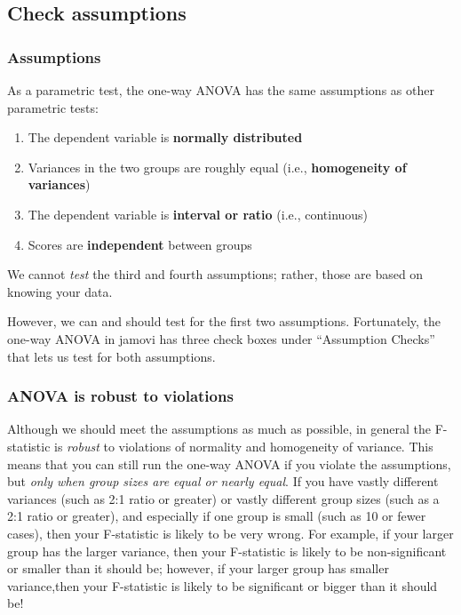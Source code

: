 \documentclass[
]{book}
\begin{document}
\hypertarget{anova-assumptions}{%
\subsection{Check assumptions}\label{anova-assumptions}}

\hypertarget{assumptions-3}{%
\subsubsection{Assumptions}\label{assumptions-3}}

As a parametric test, the one-way ANOVA has the same assumptions as other parametric tests:

\begin{enumerate}
\def\labelenumi{\arabic{enumi}.}
\item
  The dependent variable is \textbf{normally distributed}
\item
  Variances in the two groups are roughly equal (i.e., \textbf{homogeneity of variances})
\item
  The dependent variable is \textbf{interval or ratio} (i.e., continuous)
\item
  Scores are \textbf{independent} between groups
\end{enumerate}

We cannot \emph{test} the third and fourth assumptions; rather, those are based on knowing your data.

However, we can and should test for the first two assumptions. Fortunately, the one-way ANOVA in jamovi has three check boxes under ``Assumption Checks'' that lets us test for both assumptions.

\hypertarget{anova-is-robust-to-violations}{%
\subsubsection{ANOVA is robust to violations}\label{anova-is-robust-to-violations}}

Although we should meet the assumptions as much as possible, in general the F-statistic is \emph{robust} to violations of normality and homogeneity of variance. This means that you can still run the one-way ANOVA if you violate the assumptions, but \emph{only when group sizes are equal or nearly equal}. If you have vastly different variances (such as 2:1 ratio or greater) or vastly different group sizes (such as a 2:1 ratio or greater), and especially if one group is small (such as 10 or fewer cases), then your F-statistic is likely to be very wrong. For example, if your larger group has the larger variance, then your F-statistic is likely to be non-significant or smaller than it should be; however, if your larger group has smaller variance,then your F-statistic is likely to be significant or bigger than it should be!
\end{document}
